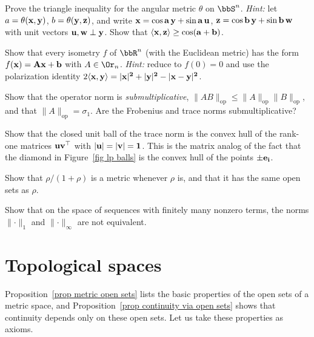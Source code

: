 \begin{xca}\label{xca angular metric}
    Prove the triangle inequality for the angular metric $\theta$ on $\bbS^n$. \emph{Hint:} let $a=\theta(\bf{x},\bf{y})$, $b=\theta(\bf{y},\bf{z})$, and write $\bf{x}=\cos a\, \bf{y}+\sin a\, \bf{u}$, $\bf{z}=\cos b\, \bf{y}+\sin b\, \bf{w}$ with unit vectors $\bf{u},\bf{w}\perp \bf{y}$. Show that $\langle \bf{x},\bf{z}\rangle\geq\cos(a+b)$.
\end{xca}
\begin{xca}\label{xca isometries of Rn}
    Show that every isometry $f$ of $\bbR^n$ (with the Euclidean metric) has the form $f(\bf{x})=A\bf{x}+\bf{b}$ with $A\in\Or_n$. \emph{Hint:} reduce to $f(0)=0$ and use the polarization identity $2\langle \bf{x},\bf{y}\rangle=\lvert \bf{x}\rvert^2+\lvert \bf{y}\rvert^2-\lvert \bf{x}-\bf{y}\rvert^2$.
\end{xca}
\begin{xca}
    Show that the operator norm is \emph{submultiplicative}, $\lVert AB\rVert_{\mathrm{op}}\leq \lVert A\rVert_{\mathrm{op}}\lVert B\rVert_{\mathrm{op}}$, and that $\lVert A\rVert_{\mathrm{op}}=\sigma_1$. Are the Frobenius and trace norms submultiplicative?
\end{xca}
\begin{xca}
    Show that the closed unit ball of the trace norm is the convex hull of the rank-one matrices $\bf{u}\bf{v}^\top$ with $\lvert \bf{u}\rvert=\lvert \bf{v}\rvert=1$. This is the matrix analog of the fact that the diamond in Figure~\ref{fig lp balls} is the convex hull of the points $\pm \bf{e}_i$.
\end{xca}
\begin{xca}
    Show that $\rho/(1+\rho)$ is a metric whenever $\rho$ is, and that it has the same open sets as $\rho$.
\end{xca}
\begin{xca}
    Show that on the space of sequences with finitely many nonzero terms, the norms $\lVert\cdot\rVert_1$ and $\lVert\cdot\rVert_\infty$ are not equivalent.
\end{xca}


\section{Topological spaces}\label{sec: topological spaces}

Proposition~\ref{prop metric open sets} lists the basic properties of the open sets of a metric space, and Proposition~\ref{prop continuity via open sets} shows that continuity depends only on these open sets. Let us take these properties as axioms.

